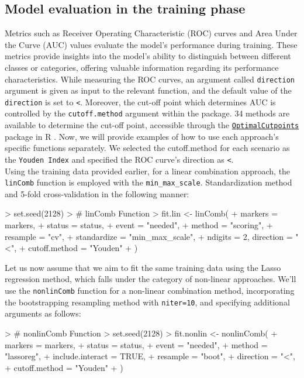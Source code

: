 \documentclass[10pt]{article}
\newcommand{\CRANpkg}[1]{\href{https://CRAN.R-project.org/package=#1}{\texttt{#1}}}
\begin{document}
\subsection{Model evaluation in the training phase}
Metrics such as Receiver Operating Characteristic (ROC) curves and Area Under the Curve (AUC) values evaluate the model's performance during training. These metrics provide insights into the model's ability to distinguish between different classes or categories, offering valuable information regarding its performance characteristics. While measuring the ROC curves, an argument called \texttt{direction} argument is given as input to the relevant function, and the default value of the \texttt{direction} is set to \texttt{<}. Moreover, the cut-off point which determines AUC is controlled by the \texttt{cutoff.method} argument within the package. 34 methods are available to determine the cut-off point, accessible through the \CRANpkg{OptimalCutpoints} package in R \citep{lopez2014optimalcutpoints}.
Now, we will provide examples of how to use each approach's specific functions separately. We selected the cutoff.method for each scenario as the \texttt{Youden Index} and specified the ROC curve's direction as \texttt{<}.\\
Using the training data provided earlier, for a linear combination approach, the \texttt{linComb} function is employed with the \texttt{min\_max\_scale}. Standardization method and 5-fold cross-validation in the following manner:
\begin{Schunk}
\begin{Sinput}
> set.seed(2128)
> # linComb Function
> fit.lin <- linComb(
+   markers = markers,
+   status = status,
+   event = "needed",
+   method = "scoring",
+   resample = "cv",
+   standardize = "min_max_scale",
+   ndigits = 2, direction = "<",
+   cutoff.method = "Youden"
+ )
\end{Sinput}
\end{Schunk}
Let us now assume that we aim to fit the same training data using the Lasso regression method, which falls under the category of non-linear approaches. We'll use the \texttt{nonlinComb} function for a non-linear combination method, incorporating the bootstrapping resampling method with \texttt{niter=10}, and specifying additional arguments as follows:
\begin{Schunk}
\begin{Sinput}
> # nonlinComb Function
> set.seed(2128)
> fit.nonlin <- nonlinComb(
+   markers = markers,
+   status = status,
+   event = "needed",
+   method = "lassoreg",
+   include.interact = TRUE,
+   resample = "boot",
+   direction = "<",
+   cutoff.method = "Youden"
+ )
\end{Sinput}
\end{Schunk}
\end{document}
